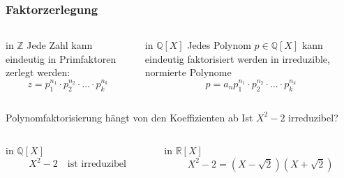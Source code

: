 %
%
%
\begin{frame}[t]
\frametitle{Faktorzerlegung}
\setlength{\abovedisplayskip}{5pt}
\setlength{\belowdisplayskip}{5pt}
\begin{columns}[t,onlytextwidth]
\begin{column}{0.48\textwidth}
\begin{block}{in $\mathbb{Z}$}
Jede Zahl kann eindeutig in Primfaktoren zerlegt werden:
\[
z = p_1^{n_1}\cdot p_2^{n_2} \cdot\dots\cdot p_k^{n_k}
\]
\end{block}
\end{column}
\begin{column}{0.48\textwidth}
\begin{block}{in $\mathbb{Q}[X]$}
Jedes Polynom $p\in\mathbb{Q}[X]$
kann eindeutig faktorisiert werden in irreduzible, normierte Polynome
\[
p
=
a_n
p_1^{n_1}
\cdot
p_2^{n_2}
\cdot
\dots
\cdot
p_k^{n_k}
\]
\end{block}
\end{column}
\end{columns}
\begin{block}{Polynomfaktorisierung hängt von den Koeffizienten ab}
Ist $X^2-2$ irreduzibel?
\vspace{-5pt}
\begin{columns}[t,onlytextwidth]
\begin{column}{0.48\textwidth}
\begin{block}{in $\mathbb{Q}[X]$}
\[
X^2-2\quad\text{ist irreduzibel}
\]
\end{block}
\end{column}
\begin{column}{0.48\textwidth}
\begin{block}{in $\mathbb{R}[X]$}
\[
X^2-2 = (X-\sqrt{2})(X+\sqrt{2})
\]
\end{block}
\end{column}
\end{columns}
\end{block}
\end{frame}

